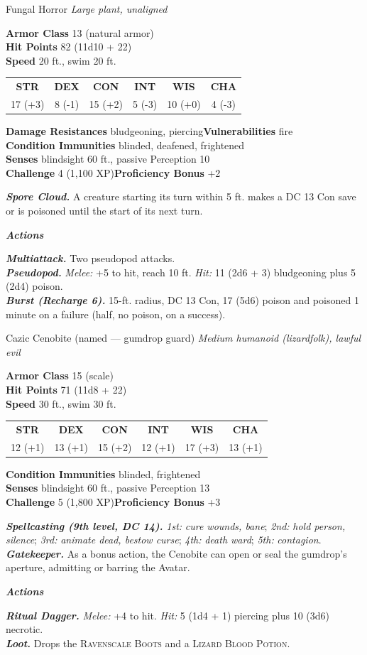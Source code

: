 \documentclass[10pt,twoside]{article}
\newcommand{\abilities}[6]{%
\begin{center}\small
\setlength{\tabcolsep}{6pt}\renewcommand{\arraystretch}{1.05}
\begin{tabular}{cccccc}
\textbf{STR}&\textbf{DEX}&\textbf{CON}&\textbf{INT}&\textbf{WIS}&\textbf{CHA}\\[1pt]
#1&#2&#3&#4&#5&#6\\
\end{tabular}\end{center}}
\newcommand{\sbrule}{\par\vspace{2pt}\noindent{\color{bloodred}\rule{\linewidth}{1.1pt}}\par\vspace{2pt}}
\newcommand{\eqname}[1]{\textsc{#1}}
\begin{document}
\begin{statblock}{Fungal Horror}
\textit{Large plant, unaligned}\sbrule
\textbf{Armor Class} 13 (natural armor)\\
\textbf{Hit Points} 82 (11d10 + 22)\\
\textbf{Speed} 20 ft., swim 20 ft.\sbrule
\abilities{17 (+3)}{8 (-1)}{15 (+2)}{5 (-3)}{10 (+0)}{4 (-3)}
\sbrule
\textbf{Damage Resistances} bludgeoning, piercing\quad\textbf{Vulnerabilities} fire\\
\textbf{Condition Immunities} blinded, deafened, frightened\\
\textbf{Senses} blindsight 60 ft., passive Perception 10\\
\textbf{Challenge} 4 (1,100 XP)\hfill\textbf{Proficiency Bonus} +2\sbrule
\textbf{\textit{Spore Cloud.}} A creature starting its turn within 5 ft. makes a DC 13
Con save or is poisoned until the start of its next turn.\sbrule
\textit{\textbf{Actions}}\par
\textbf{\textit{Multiattack.}} Two pseudopod attacks.\\
\textbf{\textit{Pseudopod.}} \textit{Melee:} +5 to hit, reach 10 ft. \textit{Hit:} 11
(2d6 + 3) bludgeoning plus 5 (2d4) poison.\\
\textbf{\textit{Burst (Recharge 6).}} 15-ft. radius, DC 13 Con, 17 (5d6) poison and
poisoned 1 minute on a failure (half, no poison, on a success).
\end{statblock}

\begin{statblock}{Cazic Cenobite \textnormal{(named --- gumdrop guard)}}
\textit{Medium humanoid (lizardfolk), lawful evil}\sbrule
\textbf{Armor Class} 15 (scale)\\
\textbf{Hit Points} 71 (11d8 + 22)\\
\textbf{Speed} 30 ft., swim 30 ft.\sbrule
\abilities{12 (+1)}{13 (+1)}{15 (+2)}{12 (+1)}{17 (+3)}{13 (+1)}
\sbrule
\textbf{Condition Immunities} blinded, frightened\\
\textbf{Senses} blindsight 60 ft., passive Perception 13\\
\textbf{Challenge} 5 (1,800 XP)\hfill\textbf{Proficiency Bonus} +3\sbrule
\textbf{\textit{Spellcasting (9th level, DC 14).}} \emph{1st:} \textit{cure wounds,
bane}; \emph{2nd:} \textit{hold person, silence}; \emph{3rd:} \textit{animate dead,
bestow curse}; \emph{4th:} \textit{death ward}; \emph{5th:} \textit{contagion}.\\
\textbf{\textit{Gatekeeper.}} As a bonus action, the Cenobite can open or seal the
gumdrop's aperture, admitting or barring the Avatar.\sbrule
\textit{\textbf{Actions}}\par
\textbf{\textit{Ritual Dagger.}} \textit{Melee:} +4 to hit. \textit{Hit:} 5 (1d4 + 1)
piercing plus 10 (3d6) necrotic.\\
\textbf{\textit{Loot.}} Drops the \eqname{Ravenscale Boots} and a \eqname{Lizard
Blood Potion}.
\end{statblock}
\end{document}
